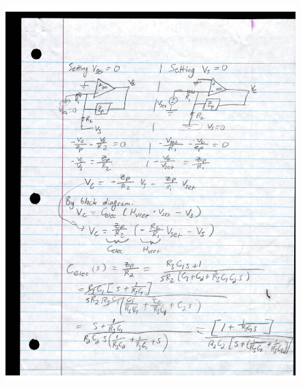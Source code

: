 \documentclass[a4paper, titlepage, 12pt]{article}
\begin{document}
\begin{enumerate}
\begin{figure}[H]
				\includegraphics[width=\linewidth]{images/c_elec_2.jpg}
			\end{figure}
			\begin{figure}[H]
				\centering

\end{figure}
\end{enumerate}
\end{document}
